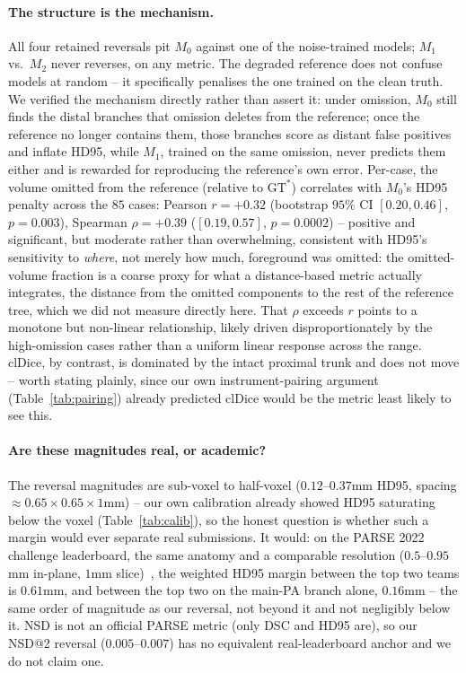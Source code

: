 \documentclass[
    bookmarks, bookmarksnumbered, bookmarksopen,
    colorlinks=true, citecolor=blue, linkcolor=blue, urlcolor=blue
]{techrep}
\newcommand{\gtstar}{\ensuremath{\mathrm{GT}^{\!*}}}
\begin{document}
\paragraph{The structure is the mechanism.} All four retained reversals pit $M_0$ against one of
the noise-trained models; $M_1$ vs.\ $M_2$ never reverses, on any metric. The degraded reference
does not confuse models at random -- it specifically penalises the one trained on the clean truth.
We verified the mechanism directly rather than assert it: under omission, $M_0$ still finds the
distal branches that omission deletes from the reference; once the reference no longer contains
them, those branches score as distant false positives and inflate HD95, while $M_1$, trained on
the same omission, never predicts them either and is rewarded for reproducing the reference's own
error. Per-case, the volume omitted from the reference (relative to $\gtstar$) correlates with
$M_0$'s HD95 penalty across the $85$ cases: Pearson $r{=}{+}0.32$ (bootstrap $95\%$ CI
$[0.20,0.46]$, $p{=}0.003$), Spearman $\rho{=}{+}0.39$ ($[0.19,0.57]$, $p{=}0.0002$) -- positive
and significant, but moderate rather than overwhelming, consistent with HD95's sensitivity to
\emph{where}, not merely how much, foreground was omitted: the omitted-volume fraction is a coarse
proxy for what a distance-based metric actually integrates, the distance from the omitted
components to the rest of the reference tree, which we did not measure directly here. That
$\rho$ exceeds $r$ points to a monotone but non-linear relationship, likely driven disproportionately
by the high-omission cases rather than a uniform linear response across the range. clDice, by
contrast, is dominated by the intact proximal trunk and does not move -- worth stating plainly,
since our own instrument-pairing argument (Table~\ref{tab:pairing}) already predicted clDice would
be the metric least likely to see this.

\paragraph{Are these magnitudes real, or academic?} The reversal magnitudes are sub-voxel to
half-voxel ($0.12$--$0.37$mm HD95, spacing $\approx0.65\times0.65\times1$mm) -- our own calibration
already showed HD95 saturating below the voxel (Table~\ref{tab:calib}), so the honest question is
whether such a margin would ever separate real submissions. It would: on the PARSE 2022 challenge
leaderboard, the same anatomy and a comparable resolution ($0.5$--$0.95$mm in-plane,
$1$mm slice)~\cite{luo2023parse}, the weighted HD95 margin between the top two teams is
$0.61$mm, and between the top two on the main-PA branch alone, $0.16$mm -- the same order of
magnitude as our reversal, not beyond it and not negligibly below it. NSD is not an official PARSE
metric (only DSC and HD95 are), so our NSD@2 reversal ($0.005$--$0.007$) has no equivalent
real-leaderboard anchor and we do not claim one.
\end{document}
